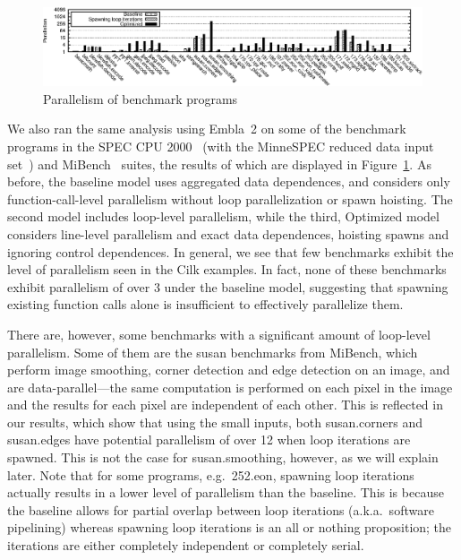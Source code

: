\begin{figure}[t]
 \centering
\includegraphics[width=4.5in]{benches}
\caption{Parallelism of benchmark programs}
\label{benchmarks}
\end{figure}

We also ran the same analysis using Embla~2 on some of the benchmark programs in the SPEC CPU 2000~\cite{henning00spec} (with the MinneSPEC reduced data input set~\cite{KleinOsowski02minnespec}) and MiBench~\cite{guthaus01mibench} suites, the results of which are displayed in Figure~\ref{benchmarks}.
As before, the baseline model uses aggregated data dependences, and considers only function-call-level parallelism without loop parallelization or spawn hoisting.
The second model includes loop-level parallelism, while the third, \textsf{Optimized} model considers line-level parallelism and exact data dependences, hoisting spawns and ignoring control dependences.
In general, we see that few benchmarks exhibit the level of parallelism seen in the Cilk examples.
In fact, none of these benchmarks exhibit parallelism of over 3 under the baseline model,
suggesting that spawning existing function calls alone is insufficient to effectively parallelize them.

There are, however, some benchmarks with a significant amount of loop-level parallelism.
Some of them are the \textsf{susan} benchmarks from MiBench, which perform image smoothing, corner detection and edge detection on an image, and are data-parallel---the same computation is performed on each pixel in the image and the results for each pixel are independent of each other.
This is reflected in our results, which show that using the small inputs, both \textsf{susan.corners} and \textsf{susan.edges} have potential parallelism of over 12 when loop iterations are spawned.
This is not the case for \textsf{susan.smoothing}, however, as we will explain later.
Note that for some programs, e.g.\ \textsf{252.eon}, spawning loop iterations actually results in a lower level of parallelism than the baseline.
This is because the baseline allows for partial overlap between loop iterations (a.k.a.\ software pipelining) whereas spawning loop iterations is an all or nothing proposition; the iterations are either completely independent or completely serial.

